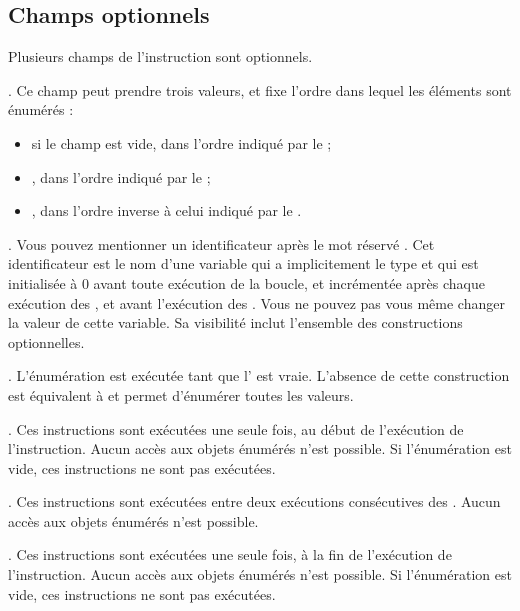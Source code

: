 \subsection{Champs optionnels}

Plusieurs champs de l'instruction  sont optionnels.

. Ce champ peut prendre trois valeurs, et fixe l'ordre dans lequel les éléments sont énumérés :
\begin{itemize}
  \item si le champ est vide, dans l'ordre indiqué par le  ;
  \item \galgas{<}, dans l'ordre indiqué par le  ;
  \item \galgas{>}, dans l'ordre inverse à celui indiqué par le .
\end{itemize}


. Vous pouvez mentionner un identificateur après le mot réservé . Cet identificateur est le nom d'une variable qui a implicitement le type  et qui est initialisée à 0 avant toute exécution de la boucle, et incrémentée après chaque exécution des , et avant l'exécution des . Vous ne pouvez pas vous même changer la valeur de cette variable. Sa visibilité inclut l'ensemble des constructions optionnelles.

. L'énumération est exécutée tant que l' est vraie. L'absence de cette construction est équivalent à  et permet d'énumérer toutes les valeurs.


. Ces instructions sont exécutées une seule fois, au début de l'exécution de l'instruction. Aucun accès aux objets énumérés n'est possible. Si l'énumération est vide, ces instructions ne sont pas exécutées.

. Ces instructions sont exécutées entre deux exécutions consécutives des . Aucun accès aux objets énumérés n'est possible.

. Ces instructions sont exécutées une seule fois, à la fin de l'exécution de l'instruction. Aucun accès aux objets énumérés n'est possible. Si l'énumération est vide, ces instructions ne sont pas exécutées.

